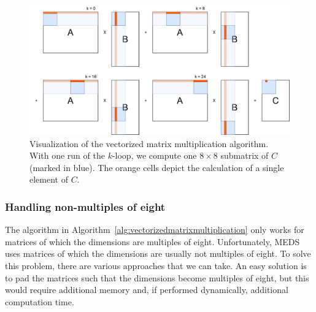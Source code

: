 \documentclass[11pt,a4paper]{report}
\theoremstyle{definition}
\begin{document}
\begin{figure}
  \centering
  \includegraphics[width=\textwidth]{matmul/parallel_matmul8.png}
  \caption{Visualization of the vectorized matrix multiplication algorithm. With one run of the $k$-loop, we compute one $8\times8$ submatrix of $C$ (marked in blue). The orange cells depict the calculation of a single element of $C$.}
  \label{fig:vectorizedmatrixmultiplication}
\end{figure}

\subsubsection{Handling non-multiples of eight}
The algorithm in Algorithm~\ref{alg:vectorizedmatrixmultiplication} only works for matrices of which the dimensions are multiples of eight. Unfortunately, MEDS uses matrices of which the dimensions are usually not multiples of eight. To solve this problem, there are various approaches that we can take. An easy solution is to pad the matrices such that the dimensions become multiples of eight, but this would require additional memory and, if performed dynamically, additional computation time.
\end{document}
